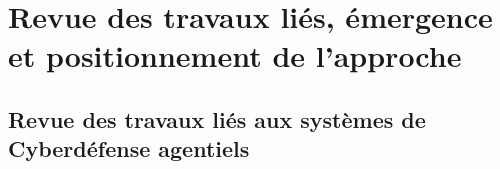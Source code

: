\documentclass[ twoside,openright,titlepage,numbers=noenddot,headinclude,%
                footinclude=true,cleardoublepage=empty,abstractoff, %
                BCOR=5mm,paper=a4,fontsize=11pt,%
                french,american,%
                ]{scrreprt}
\begin{document}




\chapter{Revue des travaux liés, émergence et positionnement de l'approche}

\section{Revue des travaux liés aux systèmes de Cyberdéfense agentiels}
\end{document}
